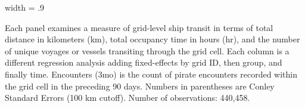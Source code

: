 \begin{table}
\begin{adjustbox}{width = .9\textwidth}
\begin{threeparttable}
\begin{tablenotes}
Each panel examines a measure of grid-level ship transit in terms of total distance in kilometers (km), 
total occupancy time in hours (hr), and the number of unique voyages or vessels transiting through the grid cell. 
Each column is a different regression analysis adding fixed-effects by grid ID, then group, and finally time.
Encounters (3mo) is the count of pirate encounters recorded within the grid cell in the preceding 90 days.
Numbers in parentheses are Conley Standard Errors (100 km cutoff). Number of observations: 440,458.
\end{tablenotes}
\end{threeparttable}
\end{adjustbox}
\end{table}
